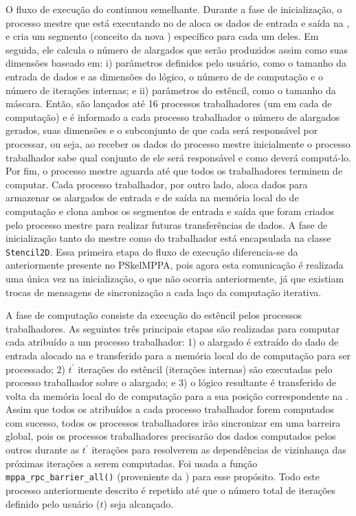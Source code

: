 O fluxo de execução do \pskelmppa continuou semelhante. Durante a fase de inicialização, o processo mestre que está executando no \cluster de \io aloca os dados de entrada e saída na \lpddr, e cria um segmento (conceito da nova \api) específico para cada um deles. Em seguida, ele calcula o número de \tiles alargados que serão produzidos assim como suas dimensões baseado em: i) parâmetros definidos pelo usuário, como o tamanho da entrada de dados e as dimensões do \tile lógico, o número de \clusters de computação e o número de iterações internas; e ii) parâmetros do  estêncil, como o tamanho da máscara. Então, são lançados até 16 processos trabalhadores (um em cada \cluster de computação) e é informado a cada processo trabalhador o número de \tiles alargados gerados, suas dimensões e o subconjunto de \tiles que cada \cluster será responsável por processar, ou seja, ao receber os dados do processo mestre inicialmente o processo trabalhador sabe qual conjunto de \tiles ele será responsável e como deverá computá-lo. Por fim, o processo mestre aguarda até que todos os trabalhadores terminem de computar.
%
Cada processo trabalhador, por outro lado, aloca dados para armazenar os \tiles alargados de entrada e de saída na memória local do \cluster de computação e clona ambos os segmentos de entrada e saída que foram criados pelo processo mestre para realizar futuras transferências de dados. A fase de inicialização tanto do mestre como do trabalhador está encapsulada na classe \texttt{Stencil2D}.
%
Essa primeira etapa do fluxo de execução diferencia-se da anteriormente presente no PSkelMPPA, pois agora esta comunicação é realizada uma única vez na inicialização, o que não ocorria anteriormente, já que existiam trocas de mensagens de sincronização a cada laço da computação iterativa.

A fase de computação consiste da execução do  estêncil pelos processos trabalhadores. As seguintes três principais etapas são realizadas para computar cada \tile atribuído a um processo trabalhador: 1) o \tile alargado é extraído do dado de entrada alocado na \lpddr e transferido para a memória local do \cluster de computação para ser processado; 2) $t^\prime$ iterações do  estêncil (iterações internas) são executadas pelo processo trabalhador sobre o \tile alargado; e 3) o \tile lógico resultante é transferido de volta da memória local do \cluster de computação para a sua posição correspondente na \lpddr. Assim que todos os \tiles atribuídos a cada processo trabalhador forem computados com sucesso, todos os processos trabalhadores irão sincronizar em uma barreira global, pois os processos trabalhadores precisarão dos dados computados pelos outros durante as $t^\prime$ iterações para resolverem as dependências de vizinhança das próximas iterações a serem computadas. 
Foi usada a função \texttt{mppa\_rpc\_barrier\_all()} (proveniente da \api \async) para esse propósito. Todo este processo anteriormente descrito é repetido até que o número total de iterações definido pelo usuário ($t$) seja alcançado.

